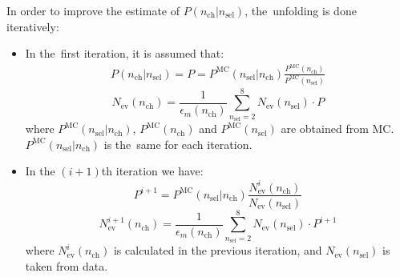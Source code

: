 \noindent 
In order to improve the estimate of $P(n_\textrm{ch}|n_\textrm{sel})$, the~unfolding  is done iteratively:
\begin{itemize}
	\item In the~first iteration, it is assumed that: \\
	\begin{eqnarray}
	P(n_\textrm{ch}|n_\textrm{sel}) = P = P^{\textrm{MC}}(n_\textrm{sel}|n_\textrm{ch})\frac{P^\textrm{MC}(n_\textrm{ch})}{P^\textrm{MC}(n_\textrm{sel})}
	\end{eqnarray}
	\begin{equation}
	N_\textrm{ev}(n_\textrm{ch})=\frac{1}{\epsilon_{m}(n_\textrm{ch})}\sum_{n_\textrm{sel}=2}^{8}N_\textrm{ev}(n_\textrm{sel})\cdot P
	\end{equation}
	where $P^{\textrm{MC}}(n_\textrm{sel}|n_\textrm{ch})$, $P^\textrm{MC}(n_\textrm{ch})$ and $P^\textrm{MC}(n_\textrm{sel})$ are obtained from MC. $P^{\textrm{MC}}(n_\textrm{sel}|n_\textrm{ch})$ is the~same for each iteration.
	
	\item In the $(i+1)$th iteration we have:
	\begin{equation}
	P^{i+1}=P^{\textrm{MC}}(n_\textrm{sel}|n_\textrm{ch})\frac{N_\textrm{ev}^{i}(n_\textrm{ch})}{N_\textrm{ev}(n_\textrm{sel})}
	\end{equation}
	\begin{equation}
	N_\textrm{ev}^{i+1}(n_\textrm{ch})=\frac{1}{\epsilon_{m}(n_\textrm{ch})}\sum_{n_\textrm{sel}=2}^{8}N_\textrm{ev}(n_\textrm{sel})\cdot P^{i+1}
	\end{equation}
	where  $N_\textrm{ev}^i(n_\textrm{ch})$ is calculated in the previous iteration, and $N_\textrm{ev}(n_\textrm{sel})$ is taken from data.
\end{itemize}


